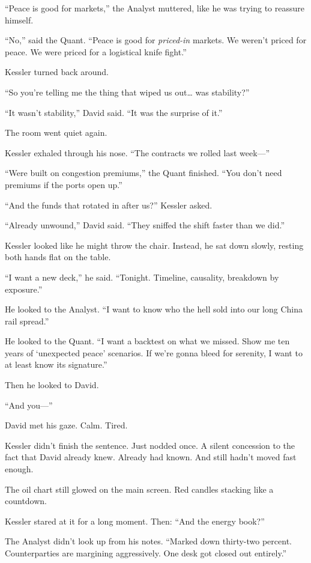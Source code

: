 “Peace is good for markets,” the Analyst muttered, like he was trying to reassure himself.

“No,” said the Quant. “Peace is good for \textit{priced-in} markets. We weren’t priced for peace. We were priced for a logistical knife fight.”

Kessler turned back around.

“So you’re telling me the thing that wiped us out… was stability?”

“It wasn’t stability,” David said. “It was the surprise of it.”

The room went quiet again.

Kessler exhaled through his nose. “The contracts we rolled last week—”

“Were built on congestion premiums,” the Quant finished. “You don’t need premiums if the ports open up.”

“And the funds that rotated in after us?” Kessler asked.

“Already unwound,” David said. “They sniffed the shift faster than we did.”

Kessler looked like he might throw the chair. Instead, he sat down slowly, resting both hands flat on the table.

“I want a new deck,” he said. “Tonight. Timeline, causality, breakdown by exposure.”

He looked to the Analyst. “I want to know who the hell sold into our long China rail spread.”

He looked to the Quant. “I want a backtest on what we missed. Show me ten years of ‘unexpected peace’ scenarios. If we’re gonna bleed for serenity, I want to at least know its signature.”

Then he looked to David.

“And you—”

David met his gaze. Calm. Tired.

Kessler didn’t finish the sentence. Just nodded once. A silent concession to the fact that David already knew. Already had known. And still hadn’t moved fast enough.

The oil chart still glowed on the main screen. Red candles stacking like a countdown.

Kessler stared at it for a long moment.
Then: “And the energy book?”

The Analyst didn’t look up from his notes. “Marked down thirty-two percent. Counterparties are margining aggressively. One desk got closed out entirely.”

